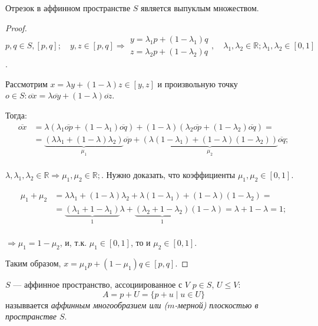 \begin{utv}
	Отрезок в аффинном пространстве $S$ является выпуклым множеством.
\end{utv}
\begin{proof}
	$p, q \in S, [p, q]; \quad y, z \in [p, q] \Rightarrow \begin{matrix}
		y = \lambda_1 p + (1 - \lambda_1) q \\
		z = \lambda_2 p + (1 - \lambda_2) q
	\end{matrix}, \quad \lambda_1, \lambda_2 \in \mathbb{R}; \lambda_1, \lambda_2 \in [0, 1]$. 
	
	Рассмотрим $x = \lambda y + (1 - \lambda) z \in [y, z]$ и произвольную точку $o \in S: \overline{ox} = \lambda \overline{oy} + (1 - \lambda) \overline{oz}$.
	
	Тогда:
	\begin{align*}
		\overline{ox} &= \lambda (\lambda_1 \overline{op} + (1 - \lambda_1) \overline{oq}) + (1 - \lambda) (\lambda_2 \overline{op} + (1 - \lambda_2) \overline{oq}) = \\ &= \underbrace{(\lambda \lambda_1 + (1 - \lambda) \lambda_2)}_{\mu_1} \overline{op} + \underbrace{(\lambda (1 - \lambda_1) + (1 - \lambda) (1 - \lambda_2))}_{\mu_2} \overline{oq}; \\
	\end{align*}
	
	$\lambda, \lambda_1, \lambda_2 \in \mathbb{R} \Rightarrow \mu_1, \mu_2 \in \mathbb{R};$. Нужно доказать, что коэффициенты $\mu_1, \mu_2 \in [0, 1]$. 
	
	\begin{align*}
		\mu_1 + \mu_2 &= \lambda \lambda_1 + (1 - \lambda) \lambda_2 + \lambda (1 - \lambda_1) + (1 - \lambda) (1 - \lambda_2) = \\ &= \underbrace{(\lambda_1 + 1 - \lambda_1)}_{1} \lambda + \underbrace{(\lambda_2 + 1 - \lambda_2)}_{1} (1 - \lambda) = \lambda + 1 - \lambda = 1; \\
	\end{align*}
	
	$\Rightarrow \mu_1 = 1 - \mu_2$, и, т.к. $\mu_1 \in [0,1]$, то и $\mu_2 \in [0, 1]$. 
	
	Таким образом, $x = \mu_1 p + (1 - \mu_1) q \in [p, q]$. 
\end{proof}

\begin{definition}
	$S$ --- аффинное пространство, ассоциированное с $V$ $p \in S$, $U \leqslant V: $
	\begin{equation*}
		A = p + U = \{p + u \mid u \in U\} 
	\end{equation*}
	назыввается \textit{аффинным многообразием или ($m$-мерной) плоскостью в пространстве $S$}.
\end{definition}

